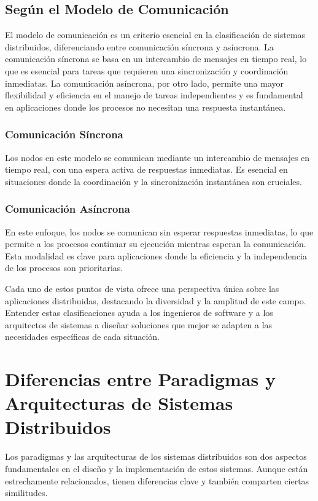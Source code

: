 \subsection{Según el Modelo de Comunicación}
El modelo de comunicación es un criterio esencial en la clasificación de sistemas distribuidos, diferenciando entre comunicación síncrona y asíncrona. La comunicación síncrona se basa en un intercambio de mensajes en tiempo real, lo que es esencial para tareas que requieren una sincronización y coordinación inmediatas. La comunicación asíncrona, por otro lado, permite una mayor flexibilidad y eficiencia en el manejo de tareas independientes y es fundamental en aplicaciones donde los procesos no necesitan una respuesta instantánea.

\subsubsection{Comunicación Síncrona}
Los nodos en este modelo se comunican mediante un intercambio de mensajes en tiempo real, con una espera activa de respuestas inmediatas. Es esencial en situaciones donde la coordinación y la sincronización instantánea son cruciales.

\subsubsection{Comunicación Asíncrona}
En este enfoque, los nodos se comunican sin esperar respuestas inmediatas, lo que permite a los procesos continuar su ejecución mientras esperan la comunicación. Esta modalidad es clave para aplicaciones donde la eficiencia y la independencia de los procesos son prioritarias.

Cada uno de estos puntos de vista ofrece una perspectiva única sobre las aplicaciones distribuidas, destacando la diversidad y la amplitud de este campo. Entender estas clasificaciones ayuda a los ingenieros de software y a los arquitectos de sistemas a diseñar soluciones que mejor se adapten a las necesidades específicas de cada situación.

\section{Diferencias entre Paradigmas y Arquitecturas de Sistemas Distribuidos}
Los paradigmas y las arquitecturas de los sistemas distribuidos son dos aspectos fundamentales en el diseño y la implementación de estos sistemas. Aunque están estrechamente relacionados, tienen diferencias clave y también comparten ciertas similitudes.

